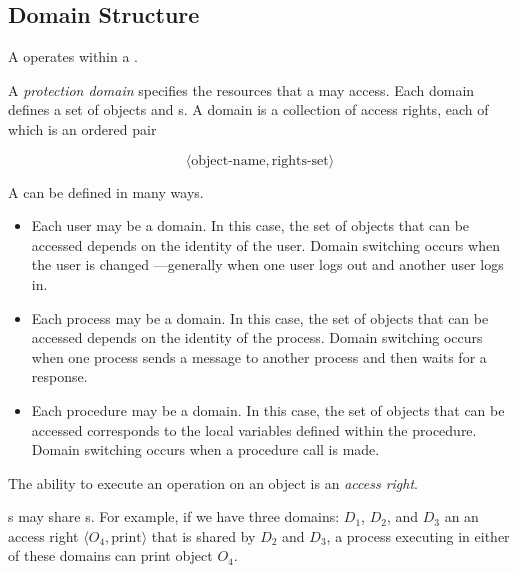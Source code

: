 \subsection{Domain Structure}\label{subsubsec:Domain_Structure}
A  operates within a .

\begin{definition}\label{def:Protection_Domain}
  A \emph{protection domain} specifies the resources that a  may access.
  Each domain defines a set of objects and s.
  A domain is a collection of access rights, each of which is an ordered pair

  \begin{equation}\label{eq:Protection_Domain}
    \langle \text{object-name}, \text{rights-set} \rangle
  \end{equation}
\end{definition}

A  can be defined in many ways.
\begin{itemize}[noitemsep]
\item Each user may be a domain. In this case, the set of objects that
  can be accessed depends on the identity of the user. Domain
  switching occurs when the user is changed —generally when one user
  logs out and another user logs in.
\item Each process may be a domain.
  In this case, the set of objects that can be accessed depends on the
  identity of the process. Domain switching occurs when one process
  sends a message to another process and then waits for a response.
\item Each procedure may be a domain. In this case, the set of objects
  that can be accessed corresponds to the local variables defined
  within the procedure. Domain switching occurs when a procedure call
  is made.
\end{itemize}

\begin{definition}\label{def:Access_Right}
  The ability to execute an operation on an object is an \emph{access right}.
\end{definition}

s may share s.
For example, if we have three domains: $D_{1}$, $D_{2}$, and $D_{3}$ an an access right $\langle O_{4}, \text{print} \rangle$ that is shared by $D_{2}$ and $D_{3}$, a process executing in either of these domains can print object $O_{4}$.

